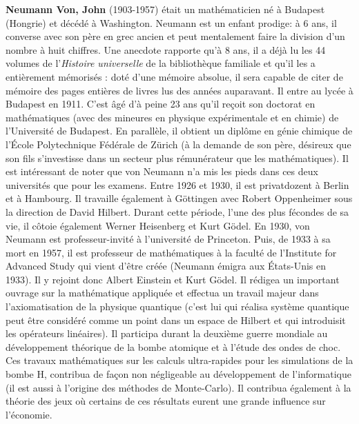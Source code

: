\textbf{Neumann Von, John} (1903-1957) était un mathématicien né à Budapest (Hongrie) et décédé à Washington. Neumann est un enfant prodige: à 6 ans, il converse avec son père en grec ancien et peut mentalement faire la division d'un nombre à huit chiffres. Une anecdote rapporte qu'à 8 ans, il a déjà lu les 44 volumes de l'\textit{Histoire universelle} de la bibliothèque familiale et qu'il les a entièrement mémorisés : doté d'une mémoire absolue, il sera capable de citer de mémoire des pages entières de livres lus des années auparavant. Il entre au lycée à Budapest en 1911. C'est âgé d'à peine 23 ans qu'il reçoit son doctorat en mathématiques (avec des mineures en physique expérimentale et en chimie) de l'Université de Budapest. En parallèle, il obtient un diplôme en génie chimique de l'École Polytechnique Fédérale de Zürich (à la demande de son père, désireux que son fils s'investisse dans un secteur plus rémunérateur que les mathématiques). Il est intéressant de noter que von Neumann n'a mis les pieds dans ces deux universités que pour les examens. Entre 1926 et 1930, il est privatdozent à Berlin et à Hambourg. Il travaille également à Göttingen avec Robert Oppenheimer sous la direction de David Hilbert. Durant cette période, l'une des plus fécondes de sa vie, il côtoie également Werner Heisenberg et Kurt Gödel. En 1930, von Neumann est professeur-invité à l'université de Princeton. Puis, de 1933 à sa mort en 1957, il est professeur de mathématiques à la faculté de l'Institute for Advanced Study qui vient d'être créée (Neumann émigra aux États-Unis en 1933). Il y rejoint donc Albert Einstein et Kurt Gödel. Il rédigea un important ouvrage sur la mathématique appliquée et effectua un travail majeur dans l'axiomatisation de la physique quantique (c'est lui qui réalisa système quantique peut être considéré comme un point dans un espace de Hilbert et qui introduisit les opérateurs linéaires). Il participa durant la deuxième guerre mondiale au développement théorique de la bombe atomique et à l'étude des ondes de choc. Ces travaux mathématiques sur les calculs ultra-rapides pour les simulations de la bombe H, contribua de façon non négligeable au développement de l'informatique (il est aussi à l'origine des méthodes de Monte-Carlo). Il contribua également à la théorie des jeux où certains de ces résultats eurent une grande influence sur l'économie.

